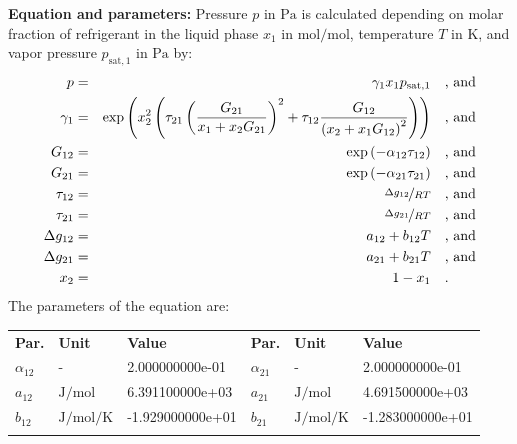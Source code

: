\textbf{Equation and parameters:}
\newline
%
Pressure $p$ in $\si{\pascal}$ is calculated depending on molar fraction of refrigerant in the liquid phase $x_1$ in $\si{\mole\per\mole}$, temperature $T$ in $\si{\kelvin}$, and vapor pressure $p_\mathrm{sat,1}$ in $\si{\pascal}$ by:
%
\begin{equation*}
\begin{split}
p &=& \gamma_1 x_1 p_\mathrm{sat,1} & \quad\text{, and} \\
\gamma_1 &=& \exp \left( x_2^2 \left( \tau_{21} \left( \frac{G_{21}}{x_1 + x_2 G_{21}} \right) ^2 + \tau_{12} \frac{G_{12}}{\left( x_2 + x_1 G_{12} \right) ^2}\right) \right) & \quad\text{, and} \\
G_{12} &=& \exp \left( -\alpha_{12} \tau_{12} \right) & \quad\text{, and} \\
G_{21} &=& \exp \left( -\alpha_{21} \tau_{21} \right) & \quad\text{, and} \\
\tau_{12} &=& \nicefrac{\Delta g_{12}}{R T} & \quad\text{, and} \\
\tau_{21} &=& \nicefrac{\Delta g_{21}}{R T} & \quad\text{, and} \\
\Delta g_{12} &=& a_{12} + b_{12} T & \quad\text{, and} \\
\Delta g_{21} &=& a_{21} + b_{21} T & \quad\text{, and} \\
x_2 &=& 1 - x_1  & \quad\text{.} \\
\end{split}
\end{equation*}
%
The parameters of the equation are:
%
\begin{longtable}[l]{lll|lll}
\toprule
\addlinespace
\textbf{Par.} & \textbf{Unit} & \textbf{Value} &	\textbf{Par.} & \textbf{Unit} & \textbf{Value} \\
\addlinespace
\midrule
\endhead

\bottomrule
\endfoot
\bottomrule
\endlastfoot
\addlinespace

$\alpha_{12}$ & - & 2.000000000e-01 & $\alpha_{21}$ & - & 2.000000000e-01 \\
$a_{12}$ & $\si{\joule\per\mole}$ & 6.391100000e+03 & $a_{21}$ & $\si{\joule\per\mole}$ & 4.691500000e+03 \\
$b_{12}$ & $\si{\joule\per\mole\per\kelvin}$ & -1.929000000e+01 & $b_{21}$ & $\si{\joule\per\mole\per\kelvin}$ & -1.283000000e+01 \\

\addlinespace\end{longtable}

